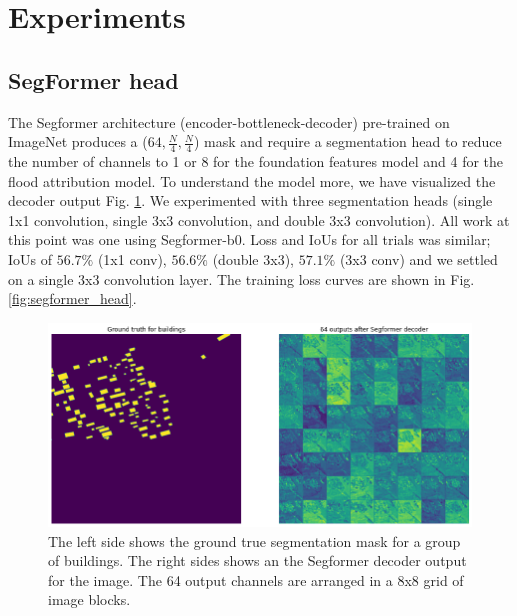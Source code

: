 \documentclass[10pt,twocolumn,letterpaper]{article}
\begin{document}



\section{Experiments}
\label{sec:experiments}

\subsection{SegFormer head}

The Segformer architecture (encoder-bottleneck-decoder) pre-trained on ImageNet produces a ($64, \frac{N}{4}, \frac{N}{4}$) mask and require a segmentation head to reduce the number of channels to 1 or 8 for the foundation features model and 4 for the flood attribution model.
To understand the model more, we have visualized the decoder output Fig. \ref{fig:segformer_decoder}. We experimented with three segmentation heads (single 1x1 convolution, single 3x3 convolution, and double 3x3 convolution). All work at this point was one using Segformer-b0. Loss and IoUs for all trials was similar; IoUs of $56.7\%$ (1x1 conv), $56.6\%$ (double 3x3), $57.1\%$ (3x3 conv) and we settled on a single 3x3 convolution layer. The training loss curves are shown in Fig. \ref{fig:segformer_head}.

\begin{figure}[t]
    \begin{center}
    \includegraphics[width=\linewidth]{final-report/figures/decoder_output_layers.png}
    \caption{The left side shows the ground true segmentation mask for a group of buildings. The right sides shows an the Segformer decoder output for the image. The 64 output channels are arranged in a 8x8 grid of image blocks.}
    \label{fig:segformer_decoder}
    \end{center}
\end{figure}
\end{document}
